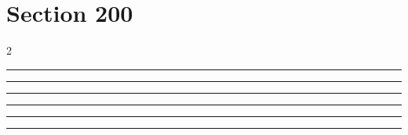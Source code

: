 \documentclass[11pt,a4paper]{article}
\begin{document}
\section{Section 200}
\begin{multicols}{2}
\begin{swarmwrap}%
  \begin{minipage}[t]{2cm}
    \centering
    \textcolor{blue!30}{\rule{\linewidth}{4cm}}
  \end{minipage}%
\end{swarmwrap}%
\swarmwrapnext\lipsum[1]\lipsum[2]
\end{multicols}
\begin{swarmwrap}%
  \begin{minipage}[t]{3cm}
    \centering
    \textcolor{red!20}{\rule{\linewidth}{5cm}}
  \end{minipage}%
\end{swarmwrap}%
\swarmwrapnext\lipsum[1]\lipsum[2]\lipsum[3]\lipsum[4]
\begin{swarmwrap}%
  \begin{minipage}[t]{4cm}
    \centering
    \textcolor{red!20}{\rule{\linewidth}{6cm}}
  \end{minipage}%
\end{swarmwrap}%
\swarmwrapnext\lipsum[1]\lipsum[2]\lipsum[3]\lipsum[4]\lipsum[5]
\begin{swarmwrap}%
  \begin{minipage}[t]{5cm}
    \centering
    \textcolor{red!20}{\rule{\linewidth}{7cm}}
  \end{minipage}%
\end{swarmwrap}%
\swarmwrapnext\lipsum[1]\lipsum[2]\lipsum[3]\lipsum[4]\lipsum[5]\lipsum[6]
\begin{swarmwrap}%
  \begin{minipage}[t]{2cm}
    \centering
    \textcolor{red!20}{\rule{\linewidth}{8cm}}
  \end{minipage}%
\end{swarmwrap}%
\swarmwrapnext\lipsum[1]
\begin{swarmwrap}%
  \begin{minipage}[t]{3cm}
    \centering
    \textcolor{red!20}{\rule{\linewidth}{9cm}}
  \end{minipage}%
\end{swarmwrap}%
\end{document}
